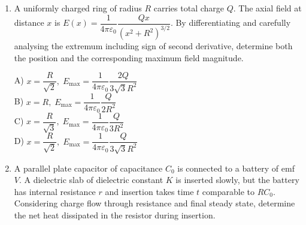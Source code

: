 \documentclass[12pt]{article}
\begin{document}
\begin{enumerate}

\item A uniformly charged ring of radius $R$ carries total charge $Q$. The axial field at distance $x$ is $E(x)=\dfrac{1}{4\pi\varepsilon_0}\dfrac{Qx}{(x^2+R^2)^{3/2}}$. By differentiating and carefully analysing the extremum including sign of second derivative, determine both the position and the corresponding maximum field magnitude.\\

\begin{center}
\end{center}


A) $x=\dfrac{R}{\sqrt{2}},\; E_{\max}=\dfrac{1}{4\pi\varepsilon_0}\dfrac{2Q}{3\sqrt{3}R^2}$\\

B) $x=R,\; E_{\max}=\dfrac{1}{4\pi\varepsilon_0}\dfrac{Q}{2R^2}$\\

C) $x=\dfrac{R}{\sqrt{3}},\; E_{\max}=\dfrac{1}{4\pi\varepsilon_0}\dfrac{Q}{3R^2}$\\

D) $x=\dfrac{R}{\sqrt{2}},\; E_{\max}=\dfrac{1}{4\pi\varepsilon_0}\dfrac{Q}{3\sqrt{3}R^2}$


\item A parallel plate capacitor of capacitance $C_0$ is connected to a battery of emf $V$. A dielectric slab of dielectric constant $K$ is inserted slowly, but the battery has internal resistance $r$ and insertion takes time $t$ comparable to $RC_0$. Considering charge flow through resistance and final steady state, determine the net heat dissipated in the resistor during insertion.\\

\begin{center}
\begin{tikzpicture}[scale=1]


\end{tikzpicture}
\end{center}
\end{enumerate}
\end{document}
